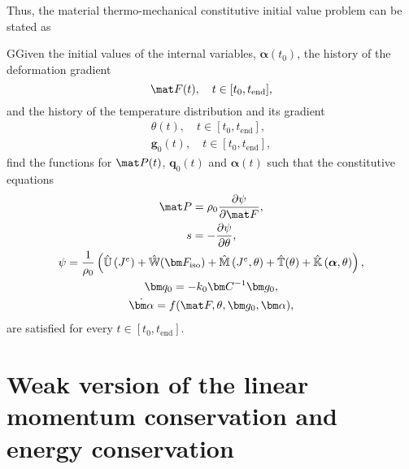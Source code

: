 Thus, the material thermo-mechanical constitutive initial value problem can be stated as
    \begin{problem}
    GGiven the initial values of the internal variables, $\bm \alpha(t_0)$, the history of the deformation gradient
    \begin{equation}
        \mat F(t),\quad t\in[t_0,t_\text{end}],
    \end{equation}
    and the history of the temperature distribution and its gradient
    \begin{gather}
    \theta(t),\quad t\in[t_0,t_\text{end}],\\
    \bm g_0(t), \quad t\in[t_0, t_\text{end}],
    \end{gather}
    find the functions for $\mat P(t)$, \(\bm q_0(t)\) and $\bm \alpha(t)$ such that the constitutive equations
    \begin{gather}
        \mat P = \rho_0 \frac{\partial \psi}{\partial \mat F},\\
        s = -\frac{\partial \psi}{\partial \theta},\\
        \psi =\frac{1}{\rho_0}\left( \hat{\mathbb{U}}\left(J^{e}\right)+\hat{\mathbb{W}}(\bm F_\text{iso})+\hat{\mathbb{M}}\left(J^{e}, \theta\right)+\hat{\mathbb{T}}(\theta)+\hat{\mathbb{K}}\left(\boldsymbol{\alpha}, \theta\right)\right),\\
        \bm q_0 = - k_0 \bm C^{-1} \bm g_0,\\
        \dot{\bm \alpha} = f(\mat F, \theta, \bm g_0 ,\bm \alpha),
    \end{gather}
    are satisfied for every $t\in [t_0, t_\text{end}]$.
    \end{problem}

\section{Weak version of the linear momentum conservation and energy conservation}

